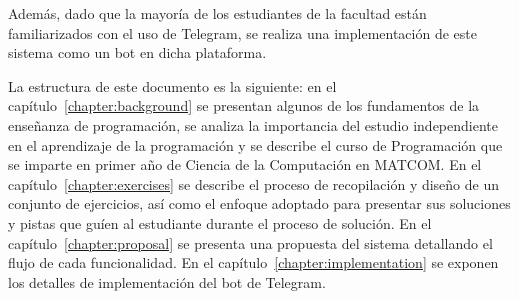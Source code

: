 \documentclass{article}
\begin{document}
Además, dado que la mayoría de los estudiantes de la facultad están familiarizados con el uso de Telegram, se realiza una implementación de este sistema como un bot en dicha plataforma.

La estructura de este documento es la siguiente: en el capítulo~\ref{chapter:background} se presentan algunos de los fundamentos de la enseñanza de programación, se analiza la importancia del estudio independiente en el aprendizaje de la programación y se describe el curso de Programación que se imparte en primer año de Ciencia de la Computación en \mbox{MATCOM}. En el capítulo~\ref{chapter:exercises} se describe el proceso de recopilación y diseño de un conjunto de ejercicios, así como el enfoque adoptado para presentar sus soluciones y pistas que guíen al estudiante durante el proceso de solución. En el capítulo~\ref{chapter:proposal} se presenta una propuesta del sistema detallando el flujo de cada funcionalidad. En el capítulo~\ref{chapter:implementation} se exponen los detalles de implementación del bot de Telegram.
\end{document}
